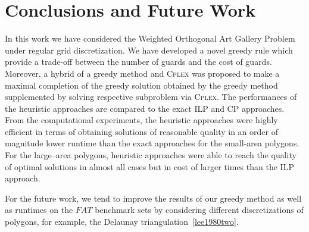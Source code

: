 \documentclass[runningheads,a4paper]{elsarticle}
\begin{document}
    
	\section{Conclusions and Future Work}
	  In this work we have considered the Weighted Orthogonal Art Gallery Problem under regular grid discretization.
	  We have developed a novel greedy rule which provide a trade-off between the number of guards and the cost of  guards. Moreover, a hybrid of a greedy method and \textsc{Cplex} was proposed to make a maximal completion of the greedy solution obtained by the greedy method supplemented by solving respective subproblem via \textsc{Cplex}. The performances of the heuristic approaches are compared to the exact ILP and CP approaches. From the computational experiments, the heuristic approaches were highly efficient in terms of obtaining solutions of reasonable quality in an order of magnitude lower runtime than the exact approaches for the small-area polygons. For the large--area polygons, heuristic approaches were able to reach the quality of optimal solutions in almost all cases but in cost of larger times than the ILP approach.
	
	  For the future work, we tend to improve the results of our greedy method as well as runtimes on the $FAT$ benchmark sets by considering different discretizations of polygons, for example, the Delaunay triangulation~\ref{lee1980two}.
	
	
	
	
	
	
	
	
	
	
\end{document}
